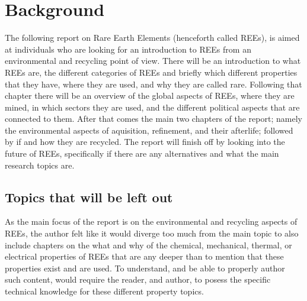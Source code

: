 \section{Background}

The following report on Rare Earth Elements (henceforth called REEs), is aimed at individuals who are looking for an introduction to REEs from an environmental and recycling point of view. There will be an introduction to what REEs are, the different categories of REEs and briefly which different properties that they have, where they are used, and why they are called rare. Following that chapter there will be an overview of the global aspects of REEs, where they are mined, in which sectors they are used, and the different political aspects that are connected to them. After that comes the main two chapters of the report; namely the environmental aspects of aquisition, refinement, and their afterlife; followed by if and how they are recycled. The report will finish off by looking into the future of REEs, specifically if there are any alternatives and what the main research topics are.

\subsection{Topics that will be left out}

As the main focus of the report is on the environmental and recycling aspects of REEs, the author felt like it would diverge too much from the main topic to also include chapters on the what and why of the chemical, mechanical, thermal, or electrical properties of REEs that are any deeper than to mention that these properties exist and are used. To understand, and be able to properly author such content, would require the reader, and author, to posess the specific technical knowledge for these different property topics.